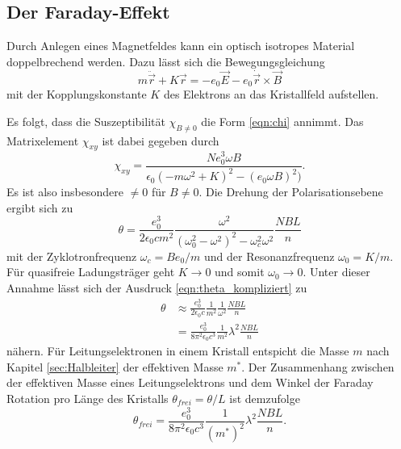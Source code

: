\subsection{Der Faraday-Effekt}
Durch Anlegen eines Magnetfeldes kann ein optisch isotropes Material doppelbrechend werden. Dazu lässt sich die Bewegungsgleichung
\begin{equation*}
    m\ddot{\vec{r}}+K\vec{r}=-e_0\vec{E}-e_0\dot{\vec{r}}\times\vec{B}
\end{equation*}
mit der Kopplungskonstante $K$ des Elektrons an das Kristallfeld aufstellen.

Es folgt, dass die Suszeptibilität $\chi_{B\neq 0}$ die Form \ref{eqn:chi} annimmt. Das Matrixelement $\chi_{xy}$ ist dabei gegeben 
durch 
\begin{equation*}
    \chi_{xy}=\frac{Ne_0^3\omega B}{\epsilon_0(-m\omega^2+K)^2-(e_0\omega B)^2)} .
\end{equation*}
Es ist also insbesondere $\neq 0$ für $B\neq 0$. Die Drehung der Polarisationsebene ergibt sich zu 
\begin{equation}
    \theta=\frac{e_0^3}{2\epsilon_0 c m^2}\frac{\omega^2}{(\omega_0^2-\omega^2)^2-\omega_c^2\omega^2}\frac{NBL}{n}
    \label{eqn:theta_kompliziert}
\end{equation}
mit der Zyklotronfrequenz $\omega_c=Be_0/m$ und der Resonanzfrequenz $\omega_0=K/m$. 
Für quasifreie Ladungsträger geht $K\to0$ und somit $\omega_0\to 0$. Unter dieser Annahme lässt sich der Ausdruck 
\ref{eqn:theta_kompliziert} zu
\begin{align*}
    \theta&\approx\frac{e_0^3}{2\epsilon_0 c}\frac{1}{m^2}\frac{1}{\omega^2}\frac{NBL}{n}\\
    &=\frac{e_0^3}{8\pi^2\epsilon_0c^3}\frac{1}{m^2}\lambda^2\frac{NBL}{n}
\end{align*} 
nähern. Für Leitungselektronen in einem Kristall entspicht die Masse $m$ nach Kapitel \ref{sec:Halbleiter} der effektiven
Masse $m^*$. Der Zusammenhang zwischen der effektiven Masse eines Leitungselektrons und dem Winkel der Faraday Rotation pro
Länge des Kristalls $\theta_{frei}=\theta/L$ ist demzufolge
\begin{equation}
    \theta_{frei}=\frac{e_0^3}{8\pi^2\epsilon_0c^3}\frac{1}{(m^*)^2}\lambda^2\frac{NBL}{n}.
    \label{eqn:winkel_masse}
\end{equation}